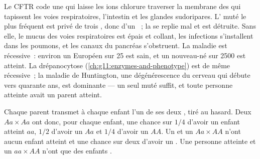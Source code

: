 \begin{example}[La mucoviscidose]\label{ex:g11:genes-and-disease:cf}
Le  CFTR code une  qui laisse les ions chlorure traverser
la membrane des  qui tapissent les voies respiratoires,
l'intestin et les glandes sudoripares. L' muté le plus fréquent
est privé de trois , donc d'un ~; la  se
replie mal et est détruite. Sans elle, le mucus des voies respiratoires
est épais et collant, les infections s'installent dans les poumons, et
les canaux du pancréas s'obstruent. La maladie est récessive~: environ
un Européen sur 25 est  sain, et un nouveau-né sur 2500 est
atteint. La drépanocytose (\cref{ch:g11:enzymes-and-phenotype}) est de
même récessive~; la maladie de Huntington, une dégénérescence du
cerveau qui débute vers quarante ans, est dominante --- un seul 
muté suffit, et toute personne atteinte avait un parent atteint.
\end{example}

\begin{proposition}\label{prop:g11:genes-and-disease:recessive}
Chaque parent transmet à chaque enfant l'un de ses deux , tiré
au hasard. Deux  $Aa \times Aa$ ont donc, pour chaque enfant,
une chance sur $1/4$ d'avoir un enfant atteint $aa$, $1/2$ d'avoir un
 $Aa$ et $1/4$ d'avoir un  $AA$. Un  et un
 $Aa \times AA$ n'ont aucun enfant atteint et une chance sur
deux d'avoir un . Une personne atteinte et un 
$aa \times AA$ n'ont que des enfants .
\end{proposition}
\admitted

